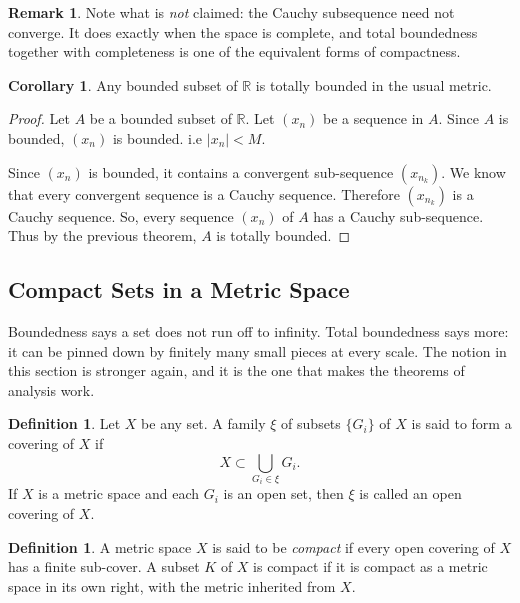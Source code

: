 \documentclass[11pt,a4paper]{article}
\theoremstyle{definition}
\newtheorem{defn}[thm]{Definition}
\newtheorem{coro}[thm]{Corollary}
\newtheorem*{remark}{Remark}
\begin{document}
\begin{remark}
Note what is \emph{not} claimed: the Cauchy subsequence need not converge. It
does exactly when the space is complete, and total boundedness together with
completeness is one of the equivalent forms of compactness.
\end{remark}


\begin{coro}
Any bounded subset of $\mathbb{R}$ is totally bounded in the usual metric.

\end{coro}

\begin{proof}
Let $A$ be a bounded subset of $\mathbb{R}$. Let $(x_n)$ be a sequence in $A$. Since $A$ is bounded, $(x_n)$ is bounded. i.e $|x_n|<M$.

Since $(x_n)$ is bounded, it contains a convergent sub-sequence $(x_{n_k})$. We know that every convergent sequence is a Cauchy sequence. Therefore $(x_{n_k})$ is a Cauchy sequence. So, every sequence $(x_n)$ of $A$ has a Cauchy sub-sequence. Thus by the previous theorem, $A$ is totally bounded.

\end{proof}



\subsection{Compact Sets in a Metric Space}

Boundedness says a set does not run off to infinity. Total boundedness says
more: it can be pinned down by finitely many small pieces at every scale. The
notion in this section is stronger again, and it is the one that makes the
theorems of analysis work.

\begin{defn}
Let $X$ be any set. A family $\xi$ of subsets $\{G_i\}$ of $X$ is said to form
a covering of $X$ if $$X\subset \bigcup_{G_i\in \xi}G_i.$$ If $X$ is a metric
space and each $G_i$ is an open set, then $\xi$ is called an open covering
of $X$.
\end{defn}

\begin{defn}
A metric space $X$ is said to be \emph{compact} if every open covering of $X$
has a finite sub-cover. A subset $K$ of $X$ is compact if it is compact as a
metric space in its own right, with the metric inherited from $X$.
\end{defn}
\end{document}
